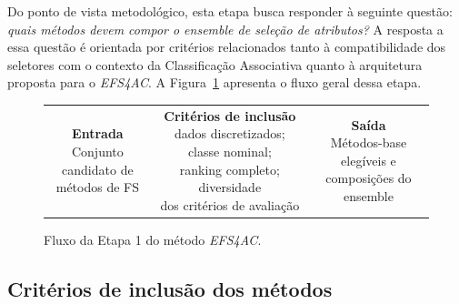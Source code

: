 Do ponto de vista metodológico, esta etapa busca responder à seguinte questão:
\textit{quais métodos devem compor o ensemble de seleção de atributos?}
A resposta a essa questão é orientada por critérios relacionados tanto à
compatibilidade dos seletores com o contexto da Classificação Associativa
quanto à arquitetura proposta para o \textit{EFS4AC}. A
Figura~\ref{fig:fluxo-etapa1-ac-efs} apresenta o fluxo geral dessa etapa.

\begin{figure}[ht]
    \centering
    \small
    \setlength{\tabcolsep}{2pt}
    \renewcommand{\arraystretch}{1.3}

    \begin{tabular}{c@{\;$\rightarrow$\;}c@{\;$\rightarrow$\;}c}

        \fbox{\parbox[c][1.9cm][c]{3.0cm}{
            \centering
            \textbf{Entrada}\\
            Conjunto candidato de\\
            métodos de FS
        }}

        &

        \fbox{\parbox[c][1.9cm][c]{5.0cm}{
            \centering
            \textbf{Critérios de inclusão}\\
            dados discretizados; classe nominal;\\
            ranking completo; diversidade\\
            dos critérios de avaliação
        }}

        &

        \fbox{\parbox[c][1.9cm][c]{4.0cm}{
            \centering
            \textbf{Saída}\\
            Métodos-base elegíveis e\\
            composições do ensemble
        }}

    \end{tabular}

    \caption{Fluxo da Etapa 1 do método \textit{EFS4AC}.}
    \label{fig:fluxo-etapa1-ac-efs}
\end{figure}


\subsection{Critérios de inclusão dos métodos}
\label{subsec:ac-efs-criterios-inclusao}

